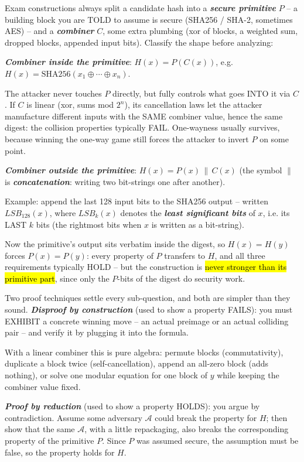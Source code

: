 \documentclass[12pt, a4paper]{article}
\newcommand{\term}[1]{\textbf{\textit{#1}}}        %
\newcommand{\imp}[1]{\hl{#1}}                       %
\begin{document}
Exam constructions always split a candidate hash into a \term{secure primitive} $P$ -- a building block you are TOLD to assume is secure (SHA256 / SHA-2, sometimes AES) -- and a \term{combiner} $C$, some extra plumbing (xor of blocks, a weighted sum, dropped blocks, appended input bits). Classify the shape before analyzing:
\begin{tightitem}
    \item \term{Combiner inside the primitive}: $H(x) = P(C(x))$, e.g. $H(x) = \mathrm{SHA256}(x_1 \oplus \cdots \oplus x_n)$.

    The attacker never touches $P$ directly, but fully controls what goes INTO it via $C$. If $C$ is linear (xor, sums mod $2^{n}$), its cancellation laws let the attacker manufacture different inputs with the SAME combiner value, hence the same digest: the collision properties typically FAIL.
    One-wayness usually survives, because winning the one-way game still forces the attacker to invert $P$ on some point.
    \item \term{Combiner outside the primitive}: $H(x) = P(x) \,\|\, C(x)$ (the symbol $\|$ is \term{concatenation}: writing two bit-strings one after another).

    Example: append the last 128 input bits to the SHA256 output -- written $LSB_{128}(x)$, where $LSB_{k}(x)$ denotes the \term{least significant bits} of $x$, i.e. its LAST $k$ bits (the rightmost bits when $x$ is written as a bit-string).

    Now the primitive's output sits verbatim inside the digest, so $H(x) = H(y)$ forces $P(x) = P(y)$: every property of $P$ transfers to $H$, and all three requirements typically HOLD -- but the construction is \imp{never stronger than its primitive part}, since only the $P$-bits of the digest do security work.
\end{tightitem}

Two proof techniques settle every sub-question, and both are simpler than they sound. \term{Disproof by construction} (used to show a property FAILS): you must EXHIBIT a concrete winning move -- an actual preimage or an actual colliding pair -- and verify it by plugging it into the formula.

With a linear combiner this is pure algebra: permute blocks (commutativity), duplicate a block twice (self-cancellation), append an all-zero block (adds nothing), or solve one modular equation for one block of $y$ while keeping the combiner value fixed.

\term{Proof by reduction} (used to show a property HOLDS): you argue by contradiction. Assume some adversary $\mathcal{A}$ could break the property for $H$; then show that the same $\mathcal{A}$, with a little repackaging, also breaks the corresponding property of the primitive $P$. Since $P$ was assumed secure, the assumption must be false, so the property holds for $H$.
\end{document}
